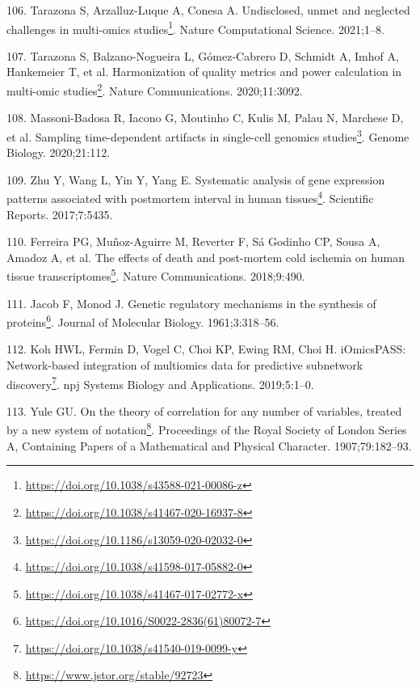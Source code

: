 \documentclass[
  a4paper,
]{book}
\DeclareRobustCommand{\href}[2]{#2\footnote{\url{#1}}}
\newlength{\cslhangindent}
\newlength{\cslentryspacingunit} %
\newenvironment{CSLReferences}[2] %
 {%
  \setlength{\parindent}{0pt}
  \ifodd #1
  \let\oldpar\par
  \def\par{\hangindent=\cslhangindent\oldpar}
  \fi
  \setlength{\parskip}{#2\cslentryspacingunit}
 }%
 {}
\begin{document}
\begin{CSLReferences}{0}{0}
\leavevmode{}%
106. Tarazona S, Arzalluz-Luque A, Conesa A. \href{https://doi.org/10.1038/s43588-021-00086-z}{Undisclosed, unmet and neglected challenges in multi-omics studies}. Nature Computational Science. 2021;1--8.

\leavevmode{}%
107. Tarazona S, Balzano-Nogueira L, Gómez-Cabrero D, Schmidt A, Imhof A, Hankemeier T, et al. \href{https://doi.org/10.1038/s41467-020-16937-8}{Harmonization of quality metrics and power calculation in multi-omic studies}. Nature Communications. 2020;11:3092.

\leavevmode{}%
108. Massoni-Badosa R, Iacono G, Moutinho C, Kulis M, Palau N, Marchese D, et al. \href{https://doi.org/10.1186/s13059-020-02032-0}{Sampling time-dependent artifacts in single-cell genomics studies}. Genome Biology. 2020;21:112.

\leavevmode{}%
109. Zhu Y, Wang L, Yin Y, Yang E. \href{https://doi.org/10.1038/s41598-017-05882-0}{Systematic analysis of gene expression patterns associated with postmortem interval in human tissues}. Scientific Reports. 2017;7:5435.

\leavevmode{}%
110. Ferreira PG, Muñoz-Aguirre M, Reverter F, Sá Godinho CP, Sousa A, Amadoz A, et al. \href{https://doi.org/10.1038/s41467-017-02772-x}{The effects of death and post-mortem cold ischemia on human tissue transcriptomes}. Nature Communications. 2018;9:490.

\leavevmode{}%
111. Jacob F, Monod J. \href{https://doi.org/10.1016/S0022-2836(61)80072-7}{Genetic regulatory mechanisms in the synthesis of proteins}. Journal of Molecular Biology. 1961;3:318--56.

\leavevmode{}%
112. Koh HWL, Fermin D, Vogel C, Choi KP, Ewing RM, Choi H. \href{https://doi.org/10.1038/s41540-019-0099-y}{{iOmicsPASS}: Network-based integration of multiomics data for predictive subnetwork discovery}. npj Systems Biology and Applications. 2019;5:1--0.

\leavevmode{}%
113. Yule GU. \href{https://www.jstor.org/stable/92723}{On the theory of correlation for any number of variables, treated by a new system of notation}. Proceedings of the Royal Society of London Series A, Containing Papers of a Mathematical and Physical Character. 1907;79:182--93.


\end{CSLReferences}
\end{document}
